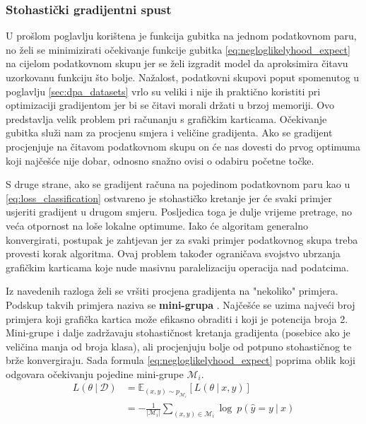 \documentclass[times, utf8, numeric, diplomski]{fer}
\def\expect{\mathbb{E}}
\def\probsep{\ |\ }
\def\dataset{\mathcal{D}}
\def\minibatch{\mathcal{M}}
\begin{document}
\subsubsection{Stohastički gradijentni spust}
U prošlom poglavlju korištena je funkcija gubitka na jednom podatkovnom paru, no želi se minimizirati očekivanje funkcije gubitka \eqref{eq:negloglikelyhood_expect} na cijelom podatkovnom skupu jer se želi izgradit model da aproksimira čitavu uzorkovanu funkciju što bolje. Nažalost, podatkovni skupovi poput spomenutog u poglavlju \ref{sec:dpa_datasets} vrlo su veliki i nije ih praktično koristiti pri optimizaciji gradijentom jer bi se čitavi morali držati u brzoj memoriji. Ovo predstavlja velik problem pri računanju s grafičkim karticama. Očekivanje gubitka služi nam za procjenu smjera i veličine gradijenta. Ako se gradijent procjenjuje na čitavom podatkovnom skupu on će nas dovesti do prvog optimuma koji najčešće nije dobar, odnosno snažno ovisi o odabiru početne točke. 

S druge strane, ako se gradijent računa na pojedinom podatkovnom paru kao u \eqref{eq:loss_classification} ostvareno je stohastičko kretanje jer će svaki primjer usjeriti gradijent u drugom smjeru. Posljedica toga je dulje vrijeme pretrage, no veća otpornost na loše lokalne optimume. Iako će algoritam generalno konvergirati, postupak je zahtjevan jer za svaki primjer podatkovnog skupa treba provesti korak algoritma. Ovaj problem također ograničava svojstvo ubrzanja grafičkim karticama koje nude masivnu paralelizaciju operacija nad podatcima.

Iz navedenih razloga želi se vršiti procjena gradijenta na "nekoliko" primjera. Podskup takvih primjera naziva se \textbf{mini-grupa} . Najčešće se uzima najveći broj primjera koji grafička kartica može efikasno obraditi i koji je potencija broja 2. Mini-grupe i dalje zadržavaju stohastičnost kretanja gradijenta (posebice ako je veličina manja od broja klasa), ali procjenjuju bolje od potpuno stohastičnog te brže konvergiraju. Sada formula \eqref{eq:negloglikelyhood_expect} poprima oblik koji odgovara očekivanju pojedine mini-grupe $\minibatch_i$.
\begin{equation}
\label{eq:negloglikelyhood_expect}
\begin{split}
L(\theta \probsep \dataset) &= \expect_{(x,y) \sim p_{\minibatch_i}}[L(\theta \probsep x,y)] \\
&= -\frac{1}{|\minibatch_i|} \sum_{(x,y)\in\minibatch_i} \log\ p(\hat{y}=y \probsep x)
\end{split}
\end{equation}
\end{document}
